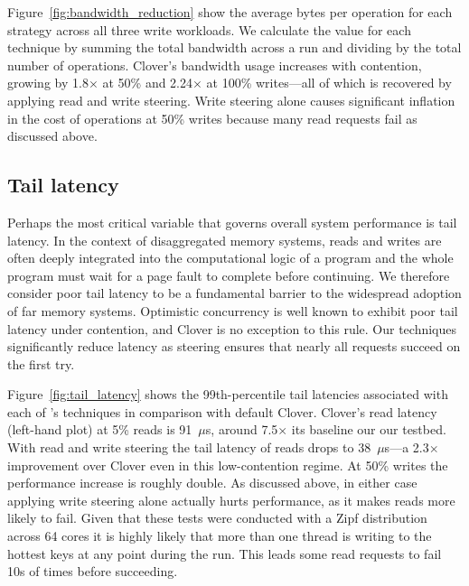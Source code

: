 Figure~\ref{fig:bandwidth_reduction} show the average bytes per
operation for each strategy across all three write workloads. We
calculate the value for each technique by summing the total bandwidth
across a run and dividing by the total number of operations. Clover's
bandwidth usage increases with contention, growing by 1.8$\times$ at
50\% and 2.24$\times$ at 100\% writes---all of which is recovered by
applying read and write steering. Write steering alone causes
significant inflation in the cost of operations at 50\% writes because many
read requests fail as discussed above.

\subsection{Tail latency}

Perhaps the most critical variable that governs overall system
performance is tail latency. In the context of disaggregated memory
systems, reads and writes are often deeply integrated into the
computational logic of a program and the whole program must wait for a
page fault to complete before continuing. We therefore consider poor
tail latency to be a fundamental barrier to the widespread adoption of
far memory systems.  Optimistic concurrency is well known to exhibit
poor tail latency under contention, and Clover is no exception to this
rule. Our techniques significantly reduce latency as steering
ensures that nearly all requests succeed on the first try.

Figure~\ref{fig:tail_latency} shows the 99th-percentile tail latencies
associated with each of \sword's techniques in comparison with default
Clover. Clover's read latency (left-hand plot) at 5\% reads is
91~$\mu$s, around 7.5$\times$ its baseline our our testbed. With read
and write steering the tail latency of reads drops to 38~$\mu$s---a
2.3$\times$ improvement over Clover even in this low-contention
regime. At 50\% writes the performance increase is roughly double.  As
discussed above, in either case applying write steering alone actually
hurts performance, as it makes reads more likely to fail.
Given that these tests were conducted with a
Zipf distribution across 64 cores it is highly likely that more than
one thread is writing to the hottest keys at any point during the
run. This leads some read requests to fail 10s of times before
succeeding.

